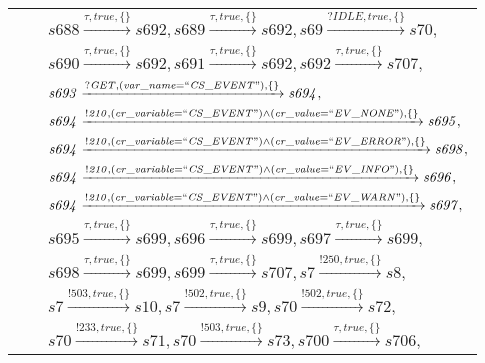 \begin{tabular}{lcp{350px}}
\end{tabular}

\begin{tabular}{lcp{350px}}
& & $\mathit{s688}\xrightarrow{\mathit{\tau}, \mathit{true}, \{\}}\mathit{s692},\mathit{s689}\xrightarrow{\mathit{\tau}, \mathit{true}, \{\}}\mathit{s692},\mathit{s69}\xrightarrow{\mathit{?IDLE}, \mathit{true}, \{\}}\mathit{s70},$ \\
& & $\mathit{s690}\xrightarrow{\mathit{\tau}, \mathit{true}, \{\}}\mathit{s692},\mathit{s691}\xrightarrow{\mathit{\tau}, \mathit{true}, \{\}}\mathit{s692},\mathit{s692}\xrightarrow{\mathit{\tau}, \mathit{true}, \{\}}\mathit{s707},$ \\
& & $\mathit{s693}\xrightarrow{\mathit{?GET}, \mathit{(var\_name = ``CS\_EVENT")}, \{\}}\mathit{s694},$ \\
& & $\mathit{s694}\xrightarrow{\mathit{!210}, \mathit{(cr\_variable = ``CS\_EVENT") \land (cr\_value = ``EV\_NONE")}, \{\}}\mathit{s695},$ \\
& & $\mathit{s694}\xrightarrow{\mathit{!210}, \mathit{(cr\_variable = ``CS\_EVENT") \land (cr\_value = ``EV\_ERROR")}, \{\}}\mathit{s698},$ \\
& & $\mathit{s694}\xrightarrow{\mathit{!210}, \mathit{(cr\_variable = ``CS\_EVENT") \land (cr\_value = ``EV\_INFO")}, \{\}}\mathit{s696},$ \\
& & $\mathit{s694}\xrightarrow{\mathit{!210}, \mathit{(cr\_variable = ``CS\_EVENT") \land (cr\_value = ``EV\_WARN")}, \{\}}\mathit{s697},$ \\
& & $\mathit{s695}\xrightarrow{\mathit{\tau}, \mathit{true}, \{\}}\mathit{s699},\mathit{s696}\xrightarrow{\mathit{\tau}, \mathit{true}, \{\}}\mathit{s699},\mathit{s697}\xrightarrow{\mathit{\tau}, \mathit{true}, \{\}}\mathit{s699},$ \\
& & $\mathit{s698}\xrightarrow{\mathit{\tau}, \mathit{true}, \{\}}\mathit{s699},\mathit{s699}\xrightarrow{\mathit{\tau}, \mathit{true}, \{\}}\mathit{s707},\mathit{s7}\xrightarrow{\mathit{!250}, \mathit{true}, \{\}}\mathit{s8},$ \\
& & $\mathit{s7}\xrightarrow{\mathit{!503}, \mathit{true}, \{\}}\mathit{s10},\mathit{s7}\xrightarrow{\mathit{!502}, \mathit{true}, \{\}}\mathit{s9},\mathit{s70}\xrightarrow{\mathit{!502}, \mathit{true}, \{\}}\mathit{s72},$ \\
& & $\mathit{s70}\xrightarrow{\mathit{!233}, \mathit{true}, \{\}}\mathit{s71},\mathit{s70}\xrightarrow{\mathit{!503}, \mathit{true}, \{\}}\mathit{s73},\mathit{s700}\xrightarrow{\mathit{\tau}, \mathit{true}, \{\}}\mathit{s706},$ \\

\end{tabular}
